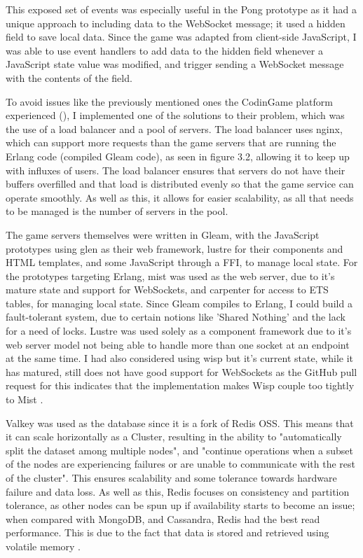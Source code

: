 \documentclass[]{final}
\begin{document}
This exposed set of events was especially useful in the Pong prototype as
it had a unique approach to including data to the WebSocket message; it used
a hidden field to save local data. Since the game was adapted from
client-side JavaScript, I was able to use event handlers to add data to the
hidden field whenever a JavaScript state value was modified, and trigger
sending a WebSocket message with the contents of the field.

To avoid issues like the previously mentioned ones the CodinGame platform
experienced {\hypersetup{linkcolor=teal}(\pageref{rationale_problem})}, I
implemented one of the
solutions to their problem, which was the use of a load balancer and a pool
of servers\cite{jobert_story_2017}. The load balancer uses nginx, which can
support more requests
than the game servers that are running the Erlang code (compiled Gleam code),
as seen in figure 3.2, allowing it to keep up with influxes of users.
The load balancer ensures that servers do not have their buffers overfilled
and that load is distributed evenly so that the game service can operate smoothly.
As well as this, it allows for easier scalability, as all that needs to be managed is the
number of servers in the pool.


The game servers themselves were written in Gleam, with the JavaScript prototypes
using glen as their web framework, lustre for their components and HTML templates,
and some JavaScript through a FFI, to manage local state. For the prototypes
targeting Erlang, mist was used as the web server, due to it's mature state
and support for WebSockets, and carpenter for access to ETS tables, for managing
local state. Since Gleam compiles to Erlang, I could build a fault-tolerant
system, due to certain notions like 'Shared Nothing' and the lack for a need
of locks. Lustre was used solely as a component framework due to it's web server model
not being able to handle more than one socket at an endpoint at the same time.
I had also considered using wisp but it's current state, while it has matured, still
does not have good support for WebSockets as the GitHub pull request for this indicates
that the implementation makes Wisp couple too tightly to Mist \cite{noauthor_WebSockets_nodate}.

\label{valkeyRead}

Valkey was used as the database since it is a fork of Redis OSS.
This means that it can scale horizontally as a Cluster, resulting in
the ability to "automatically split the dataset among multiple nodes", and
"continue operations when a subset of the nodes are experiencing failures
or are unable to communicate with the rest of the cluster"\cite{noauthor_scale_nodate}.
This ensures scalability and some tolerance towards hardware failure and data loss.
As well as this, Redis focuses on consistency and partition tolerance, as other nodes
can be spun up if availability starts to become an issue; when compared with
MongoDB, and Cassandra, Redis had the best read performance. This is due to the fact that data is stored and retrieved using
volatile memory \cite{department_of_information_systems_university_of_nizwa_sultanate_of_oman_study_2022}.
\end{document}

